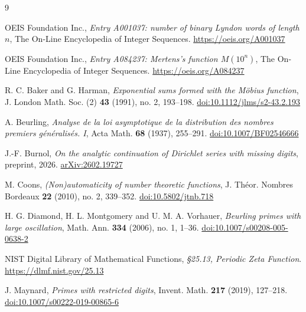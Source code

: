 \documentclass[11pt]{amsart}
\theoremstyle{definition}
\theoremstyle{remark}
\begin{document}
\begin{thebibliography}{9}

OEIS Foundation Inc., \emph{Entry A001037: number of binary Lyndon words of length $n$}, The On-Line Encyclopedia of Integer Sequences. \url{https://oeis.org/A001037}

OEIS Foundation Inc., \emph{Entry A084237: Mertens's function $M(10^{n})$}, The On-Line Encyclopedia of Integer Sequences. \url{https://oeis.org/A084237}

R. C. Baker and G. Harman, \emph{Exponential sums formed with the M\"obius function}, J. London Math. Soc. (2) \textbf{43} (1991), no. 2, 193--198. \href{https://doi.org/10.1112/jlms/s2-43.2.193}{doi:10.1112/jlms/s2-43.2.193}

A. Beurling, \emph{Analyse de la loi asymptotique de la distribution des nombres premiers g\'en\'eralis\'es. I}, Acta Math. \textbf{68} (1937), 255--291. \href{https://doi.org/10.1007/BF02546666}{doi:10.1007/BF02546666}

J.-F. Burnol, \emph{On the analytic continuation of Dirichlet series with missing digits}, preprint, 2026. \href{https://arxiv.org/abs/2602.19727}{arXiv:2602.19727}

M. Coons, \emph{(Non)automaticity of number theoretic functions}, J. Th\'eor. Nombres Bordeaux \textbf{22} (2010), no. 2, 339--352. \href{https://doi.org/10.5802/jtnb.718}{doi:10.5802/jtnb.718}

H. G. Diamond, H. L. Montgomery and U. M. A. Vorhauer, \emph{Beurling primes with large oscillation}, Math. Ann. \textbf{334} (2006), no. 1, 1--36. \href{https://doi.org/10.1007/s00208-005-0638-2}{doi:10.1007/s00208-005-0638-2}

NIST Digital Library of Mathematical Functions, \emph{\S25.13, Periodic Zeta Function}. \url{https://dlmf.nist.gov/25.13}

J. Maynard, \emph{Primes with restricted digits}, Invent. Math. \textbf{217} (2019), 127--218. \href{https://doi.org/10.1007/s00222-019-00865-6}{doi:10.1007/s00222-019-00865-6}

\end{thebibliography}
\end{document}
